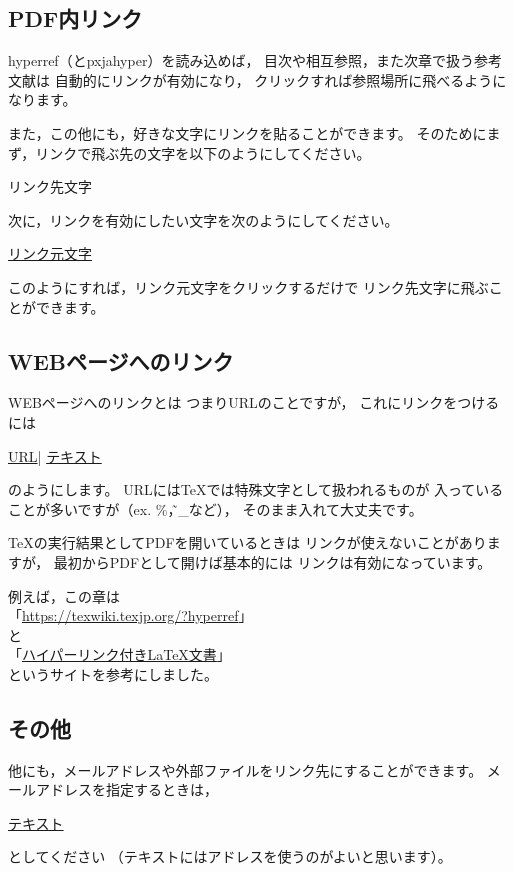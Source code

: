 \subsection{PDF内リンク}
hyperref（とpxjahyper）を読み込めば，
目次や相互参照，また次章で扱う参考文献は
自動的にリンクが有効になり，
クリックすれば参照場所に飛べるようになります。

また，この他にも，好きな文字にリンクを貼ることができます。
そのためにまず，リンクで飛ぶ先の文字を以下のようにしてください。
\begin{ITeX}
\hypertarget{リンク名}{リンク先文字}
\end{ITeX}
次に，リンクを有効にしたい文字を次のようにしてください。
\begin{ITeX}
\hyperlink{リンク名}{リンク元文字}
\end{ITeX}
このようにすれば，リンク元文字をクリックするだけで
リンク先文字に飛ぶことができます。


\subsection{WEBページへのリンク}
WEBページへのリンクとは
つまりURLのことですが，
これにリンクをつけるには
\begin{ITeX}
\url{URL}|
\href{URL}{テキスト}
\end{ITeX}
のようにします。
URLには{\TeX}では特殊文字として扱われるものが
入っていることが多いですが（ex. \%，\~，\_など），
そのまま入れて大丈夫です。

{\TeX}の実行結果としてPDFを開いているときは
リンクが使えないことがありますが，
最初からPDFとして開けば基本的には
リンクは有効になっています。

例えば，この章は \\
「\url{https://texwiki.texjp.org/?hyperref}」\\
と \\
「\href{http://www.isc.meiji.ac.jp/~mizutani/tex/link_slide/hyperlink.html}{ハイパーリンク付きLaTeX文書}」\\
というサイトを参考にしました。


\subsection{その他}
他にも，メールアドレスや外部ファイルをリンク先にすることができます。
メールアドレスを指定するときは，
\begin{ITeX}
\href{mailto:アドレス}{テキスト}
\end{ITeX}
としてください
（テキストにはアドレスを使うのがよいと思います）。

